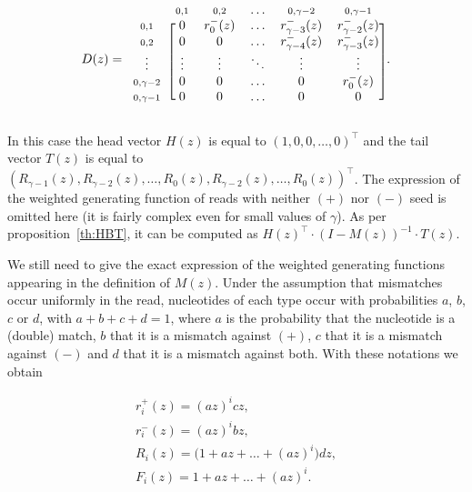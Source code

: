 \documentclass{article}
\begin{document}
\begin{equation*}
D(z) = 
\begin{blockarray}{cccccc}
   & \scriptstyle{0,1} & \scriptstyle{0,2} & \ldots &
    \scriptstyle{0,\gamma-2} & \scriptstyle{0,\gamma-1} \\
\begin{block}{c[ccccc]}
\scriptstyle{0,1} & 0 & r_0^-(z) & \ldots &
    r_{\gamma-3}^-(z) & r_{\gamma-2}^-(z) \\
\scriptstyle{0,2} & 0 & 0 & \ldots &
    r_{\gamma-4}^-(z) & r_{\gamma-3}^-(z) \\
\vdots & \vdots & \vdots & \ddots & \vdots & \vdots \\
\scriptstyle{0,\gamma-2} & 0 & 0 & \ldots & 0 & r_0^-(z) \\
\scriptstyle{0,\gamma-1} & 0 & 0 & \ldots & 0 & 0 \\
\end{block}
\end{blockarray}.
\end{equation*}


In this case the head vector $H(z)$ is equal to $(1,0,0,\ldots,0)^\top$
and the tail vector $T(z)$ is equal to $(R_{\gamma-1}(z), R_{\gamma-2}(z),
\ldots, R_0(z), R_{\gamma-2}(z), \ldots, R_0(z))^\top$. The expression of
the weighted generating function of reads with neither $(+)$ nor $(-)$
seed is omitted here (it is fairly complex even for small values of
$\gamma$). As per proposition~\ref{th:HBT}, it can be computed as
$H(z)^\top \cdot (I-M(z))^{-1} \cdot T(z)$. 

We still need to give the exact expression of the weighted generating
functions appearing in the definition of $M(z)$. Under the assumption that
mismatches occur uniformly in the read, nucleotides of each type occur
with probabilities $a$, $b$, $c$ or $d$, with $a+b+c+d=1$, where $a$ is
the probability that the nucleotide is a (double) match, $b$ that it is a
mismatch against $(+)$, $c$ that it is a mismatch against $(-)$ and $d$
that it is a mismatch against both. With these notations we obtain

\begin{equation}
\label{eq:abcd}
\begin{gathered}
r_i^+(z) = (az)^icz, \\
r_i^-(z) = (az)^ibz, \\
R_i(z) = \big( 1 + az + \ldots + (az)^i \big)dz, \\
F_i(z) = 1 + az + \ldots + (az)^i.
\end{gathered}
\end{equation}
\end{document}

